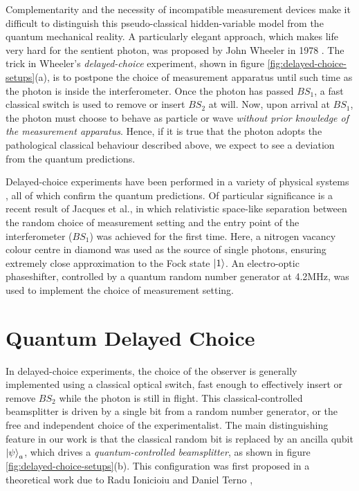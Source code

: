 Complementarity and the necessity of incompatible measurement devices make it difficult to distinguish this pseudo-classical hidden-variable model from the quantum mechanical reality. A particularly elegant approach, which makes life very hard for the sentient photon, was proposed by John Wheeler in 1978 \cite{Wheeler1978, Wheeler1984}. The trick in Wheeler's \emph{delayed-choice} experiment, shown in figure \ref{fig:delayed-choice-setups}(a), is to postpone the choice of measurement apparatus until such time as the photon is inside the interferometer. Once the photon has passed $BS_1$, a fast classical switch is used to remove or insert $BS_2$ at will. Now, upon arrival at $BS_1$, the photon must choose to behave as particle or wave \emph{without prior knowledge of the measurement apparatus}. Hence, if it is true that the photon adopts the pathological classical behaviour described above, we expect to see a deviation from the quantum predictions.

Delayed-choice experiments have been performed in a variety of physical systems \cite{Alley1987, Hellmuth1987,Lawson-Daku1996,Kim2000,Jacques2007}, all of which confirm the quantum predictions. Of particular significance is a recent result \cite{Jacques2007} of Jacques et al., in which relativistic space-like separation between the random choice of measurement setting and the entry point of the interferometer ($BS_1$) was achieved for the first time. Here, a nitrogen vacancy colour centre in diamond was used as the source of single photons, ensuring extremely close approximation to the Fock state $\mbox{$ | 1 \rangle $}$. An electro-optic phaseshifter, controlled by a quantum random number generator at 4.2MHz, was used to implement the choice of measurement setting. 



\section{Quantum Delayed Choice} 
In delayed-choice experiments, the choice of the observer is generally implemented using a classical optical switch, fast enough to effectively insert or remove $BS_2$ while the photon is still in flight. This classical-controlled beamsplitter is driven by a single bit from a random number generator, or the free and independent choice of the experimentalist.  The main distinguishing feature in our work 
is that the classical random bit is replaced by an ancilla qubit $\mbox{$ | \psi \rangle $}_a$, which drives a \emph{quantum-controlled beamsplitter}, as shown in figure \ref{fig:delayed-choice-setups}(b). 
This configuration was first proposed in a theoretical work due to Radu Ionicioiu and Daniel Terno \cite{Ionicioiu2011c},

